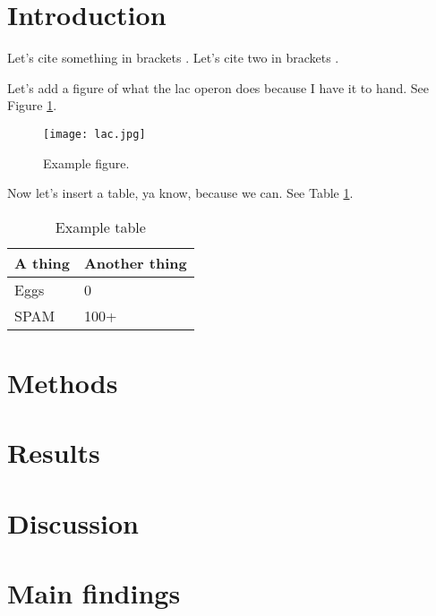 \section{Introduction}
\lipsum %
Let's cite something in brackets \citep{Kearse2012geneious}. Let's cite two in brackets \citep{Kearse2012geneious, Belhaj2013}.

Let's add a figure of what the lac operon does because I have it to hand. See Figure \ref{fig:lacbanter}.
\begin{figure}[h]
    \centering
    \texttt{[image: lac.jpg]}%
    \caption{Example figure.}
    \label{fig:lacbanter}%
\end{figure}

Now let's insert a table, ya know, because we can. See Table \ref{tab:spam}.

\begin{table}[h]
\centering
\caption{Example table}
\label{tab:spam}
\begin{tabular}{|l|l|}
\hline
A thing & Another thing \\ \hline
Eggs    & 0             \\ \hline
SPAM    & 100+          \\ \hline
\end{tabular}
\end{table}
\section{Methods}
\lipsum %
\newpage
\section{Results}
\lipsum %
\newpage
\section{Discussion}
\lipsum %
\newpage
\section{Main findings}
\lipsum %